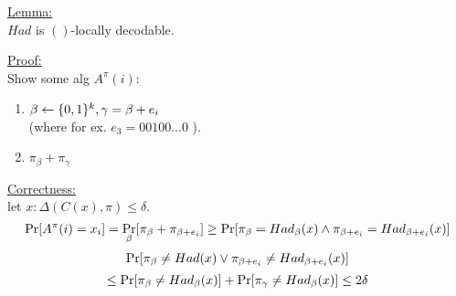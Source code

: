 \underline{Lemma:}\\
$Had$ is $()$-locally decodable.

\underline{Proof:}\\
Show some alg $A^\pi(i)$:
\begin{enumerate}
	\item $\beta\leftarrow \{0,1\}^k, \gamma =\beta+e_i$\\
	(where for ex. $e_3=00100...0$ ).
	\item $\pi_\beta+\pi_\gamma$
\end{enumerate}

\underline{Correctness:}\\
let $x: \Delta(C(x),\pi)\leq\delta$.
\[
	\operatorname*{Pr}[A^\pi(i)=x_i]
	=\operatorname*{Pr}_\beta[\pi_\beta+\pi_{\beta+e_i}]
	\geq\operatorname*{Pr}[\pi_\beta=Had_\beta(x)\wedge \pi_{\beta+e_i}=Had_{\beta+e_i}(x)]
\]\[
	\operatorname*{Pr}[\pi_\beta\neq Had(x)\vee \pi_{\beta+e_i}\neq Had_{\beta+e_i}(x)]
\]\[
	\leq \operatorname*{Pr}[\pi_\beta\neq Had_\beta(x)]+\operatorname*{Pr}[\pi_\gamma\neq Had_\beta(x)]
	\leq 2\delta
\]